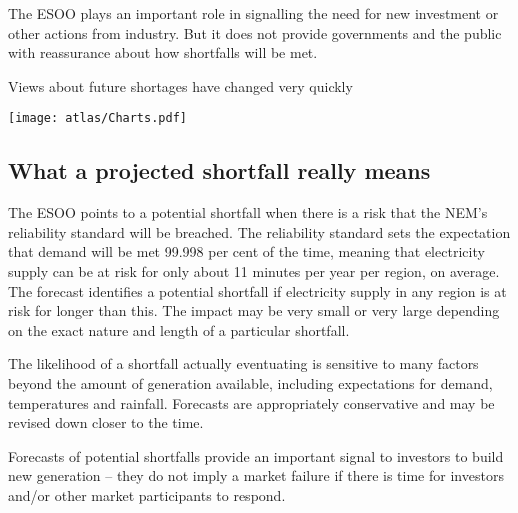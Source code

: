 \documentclass[FrontPage]{grattan}
\begin{document}
The ESOO plays an important role in signalling the need for new investment or other actions from industry. But it does not provide governments and the public with reassurance about how shortfalls will be met.

\begin{figureTop}
\caption{Views about future shortages have changed very quickly}\label{fig:resource-adequacy-projections-over-time}
\texttt{[image: atlas/Charts.pdf]}
\end{figureTop}

\subsection{What a projected shortfall really means}\label{subsec:what-a-projected-shortfall-really-means}
The ESOO points to a potential shortfall when there is a risk that the NEM’s reliability standard will be breached. The reliability standard sets the expectation that demand will be met 99.998 per cent of the time, meaning that electricity supply can be at risk for only about 11 minutes per year per region, on average. The forecast identifies a potential shortfall if electricity supply in any region is at risk for longer than this. The impact may be very small or very large depending on the exact nature and length of a particular shortfall.

The likelihood of a shortfall actually eventuating is sensitive to many factors beyond the amount of generation available, including expectations for demand, temperatures and rainfall. Forecasts are appropriately conservative and may be revised down closer to the time.

Forecasts of potential shortfalls provide an important signal to investors to build new generation -- they do not imply a market failure if there is time for investors and/or other market participants to respond.
\end{document}
